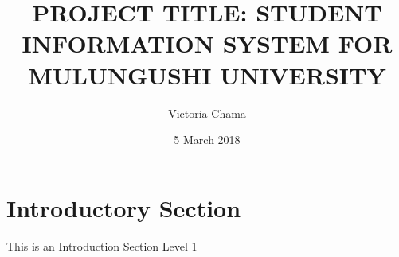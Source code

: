 \documentclass{article}
\title{PROJECT TITLE: STUDENT INFORMATION SYSTEM FOR MULUNGUSHI UNIVERSITY}
\author{Victoria Chama}
\date{5 March 2018}
\begin{document}
	
		\maketitle
	
	\section{Introductory Section}
	This is an Introduction Section Level 1
	
\end{document}
